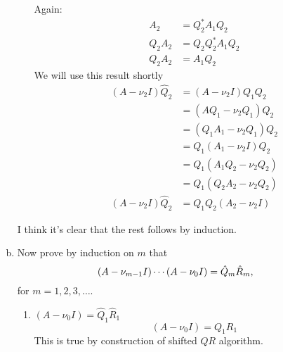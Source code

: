 \documentclass[10pt,letterpaper]{article}
\newcommand{\QR}{\ensuremath{QR} }
\begin{document}
\begin{enumerate}[(a)]
\begin{enumerate}[$m=1$: ]
                Again:
                \begin{subequations}\begin{align}
                    A_2 &= Q_2^*A_1Q_2 \\[2mm]
                    Q_2A_2 &= Q_2Q_2^*A_1Q_2 \\
                    Q_2A_2 &= A_1Q_2
                \end{align}\end{subequations}
                We will use this result shortly
                \begin{subequations}\begin{align}
                    \left(A-\nu_2 I\right)\hat{Q}_2 &= \left(A-\nu_2 I\right)Q_1Q_2 \\
                    &= \left(AQ_1-\nu_2 Q_1\right)Q_2 \\
                    &= \left(Q_1A_1-\nu_2 Q_1\right)Q_2 \\
                    &= Q_1\left(A_1-\nu_2 I\right)Q_2 \\
                    &= Q_1\left(A_1Q_2-\nu_2 Q_2\right) \\
                    &= Q_1\left(Q_2A_2-\nu_2 Q_2\right) \\[2mm]
                    \left(A-\nu_2 I\right)\hat{Q}_2 &= Q_1Q_2\left(A_2-\nu_2 I\right)
                \end{align}\end{subequations}
        \end{enumerate}
        I think it's clear that the rest follows by induction.

    \item Now prove by induction on $m$ that
        \begin{equation}
            \left(A - \nu_{m-1}I\right)\cdots\left(A-\nu_0I\right) = \hat{Q}_m\hat{R}_m, \hspace{5ex}
        \end{equation}
        for $m=1,2,3,\ldots$.

        \begin{enumerate}[$m=1$: ]
            \item $\left(A-\nu_0I\right) = \hat{Q}_1\hat{R}_1$
                \begin{equation}
                    \left(A-\nu_0I\right) = Q_1R_1
                \end{equation}
                This is true by construction of shifted \QR algorithm.


\end{enumerate}
\end{enumerate}
\end{document}
